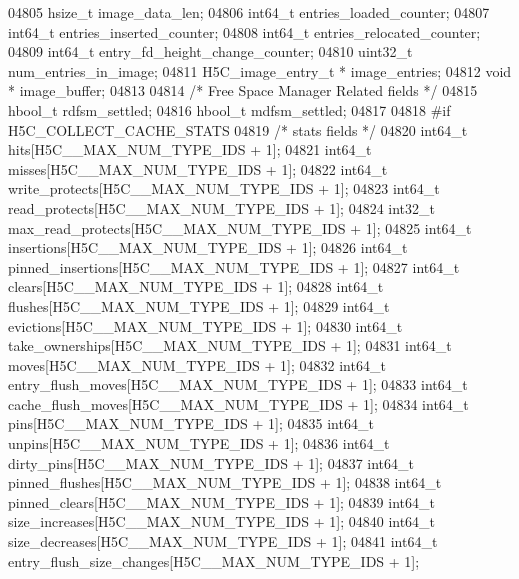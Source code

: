 \begin{DoxyCode}
04805     hsize\_t         image\_data\_len;
04806     int64\_t         entries\_loaded\_counter;
04807     int64\_t         entries\_inserted\_counter;
04808     int64\_t         entries\_relocated\_counter;
04809     int64\_t         entry\_fd\_height\_change\_counter;
04810     uint32\_t            num\_entries\_in\_image;
04811     H5C\_image\_entry\_t *     image\_entries;
04812     \textcolor{keywordtype}{void} *                      image\_buffer;
04813 
04814     \textcolor{comment}{/* Free Space Manager Related fields */}
04815     hbool\_t             rdfsm\_settled;
04816     hbool\_t         mdfsm\_settled;
04817 
04818 \textcolor{preprocessor}{#if H5C\_COLLECT\_CACHE\_STATS}
04819     \textcolor{comment}{/* stats fields */}
04820     int64\_t                     hits[H5C\_\_MAX\_NUM\_TYPE\_IDS + 1];
04821     int64\_t                     misses[H5C\_\_MAX\_NUM\_TYPE\_IDS + 1];
04822     int64\_t                     write\_protects[H5C\_\_MAX\_NUM\_TYPE\_IDS + 1];
04823     int64\_t                     read\_protects[H5C\_\_MAX\_NUM\_TYPE\_IDS + 1];
04824     int32\_t                     max\_read\_protects[H5C\_\_MAX\_NUM\_TYPE\_IDS + 1];
04825     int64\_t                     insertions[H5C\_\_MAX\_NUM\_TYPE\_IDS + 1];
04826     int64\_t                     pinned\_insertions[H5C\_\_MAX\_NUM\_TYPE\_IDS + 1];
04827     int64\_t                     clears[H5C\_\_MAX\_NUM\_TYPE\_IDS + 1];
04828     int64\_t                     flushes[H5C\_\_MAX\_NUM\_TYPE\_IDS + 1];
04829     int64\_t                     evictions[H5C\_\_MAX\_NUM\_TYPE\_IDS + 1];
04830     int64\_t                     take\_ownerships[H5C\_\_MAX\_NUM\_TYPE\_IDS + 1];
04831     int64\_t                     moves[H5C\_\_MAX\_NUM\_TYPE\_IDS + 1];
04832     int64\_t                     entry\_flush\_moves[H5C\_\_MAX\_NUM\_TYPE\_IDS + 1];
04833     int64\_t                     cache\_flush\_moves[H5C\_\_MAX\_NUM\_TYPE\_IDS + 1];
04834     int64\_t                     pins[H5C\_\_MAX\_NUM\_TYPE\_IDS + 1];
04835     int64\_t                     unpins[H5C\_\_MAX\_NUM\_TYPE\_IDS + 1];
04836     int64\_t                     dirty\_pins[H5C\_\_MAX\_NUM\_TYPE\_IDS + 1];
04837     int64\_t                     pinned\_flushes[H5C\_\_MAX\_NUM\_TYPE\_IDS + 1];
04838     int64\_t                     pinned\_clears[H5C\_\_MAX\_NUM\_TYPE\_IDS + 1];
04839     int64\_t                     size\_increases[H5C\_\_MAX\_NUM\_TYPE\_IDS + 1];
04840     int64\_t                     size\_decreases[H5C\_\_MAX\_NUM\_TYPE\_IDS + 1];
04841     int64\_t                     entry\_flush\_size\_changes[H5C\_\_MAX\_NUM\_TYPE\_IDS + 1];

\end{DoxyCode}

